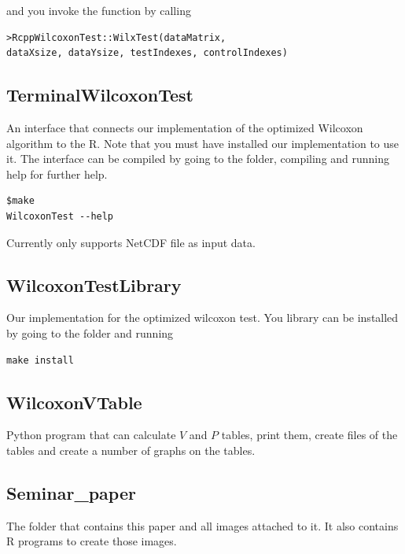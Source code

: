 \documentclass[12pt]{article}
\begin{document}
and you invoke the function by calling

\begin{lstlisting}
>RcppWilcoxonTest::WilxTest(dataMatrix,
dataXsize, dataYsize, testIndexes, controlIndexes)
\end{lstlisting}

\subsection{TerminalWilcoxonTest}

An interface that connects our implementation of the optimized Wilcoxon algorithm to the R. Note that you must have installed our implementation to use it. The interface can be compiled by going to the folder, compiling and running help for further help.

\begin{lstlisting}
$make
WilcoxonTest --help
\end{lstlisting}

Currently only supports NetCDF file as input data.

\subsection{WilcoxonTestLibrary}
Our implementation for the optimized wilcoxon test. You library can be installed by going to the folder and running

\begin{lstlisting}
make install
\end{lstlisting}

\subsection{WilcoxonVTable}
Python program that can calculate $V$ and $P$ tables, print them, create files of the tables and create a number of graphs on the tables.

\subsection{Seminar\_paper}
The folder that contains this paper and all images attached to it. It also contains R programs to create those images.

\newpage
\end{document}
